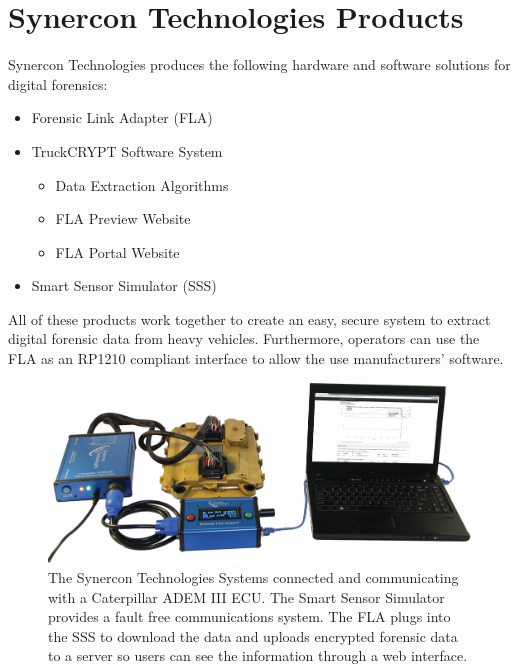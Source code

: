 \documentclass[11pt, oneside]{book}
\begin{document}
\chapter{Synercon Technologies Products}
Synercon Technologies produces the following hardware and software solutions for digital forensics:
\begin{itemize}
	\item Forensic Link Adapter (FLA)
	\item TruckCRYPT Software System
	\begin{itemize}
		\item Data Extraction Algorithms
		\item FLA Preview Website
		\item FLA Portal Website
	\end{itemize}
	\item Smart Sensor Simulator (SSS)
\end{itemize}
All of these products work together to create an easy, secure system to extract digital forensic data from heavy vehicles.
Furthermore, operators can use the FLA as an RP1210 compliant interface to allow the use manufacturers' software.
\begin{figure}[H]
\begin{center}
\includegraphics[width=.9\linewidth]{../media/syercon_synergisics/single_laptop}
\end{center}
\caption{\label{CompleteSystem}The Synercon Technologies Systems connected and communicating with a Caterpillar ADEM III ECU. The Smart Sensor Simulator provides a fault free communications system. The FLA plugs into the SSS to download the data and uploads encrypted forensic data to a server so users can see the information through a web interface.}
\end{figure}
\end{document}
